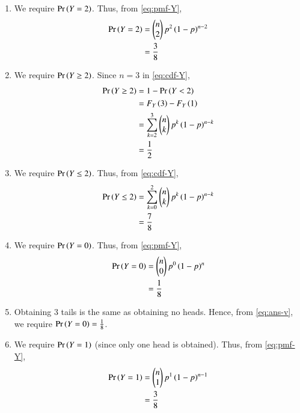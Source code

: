 \documentclass[journal,12pt,twocolumn]{IEEEtran}
\begin{document}
\begin{enumerate}
\begin{enumerate}
        \item We require $\Pr\left(Y=2\right)$. Thus, from \eqref{eq:pmf-Y},
            \begin{align}
                \Pr\left(Y=2\right) &= \begin{pmatrix}n\\2\end{pmatrix}p^2\left(1-p\right)^{n-2} \\
                         &= \frac{3}{8}
            \end{align}

        \item We require $\Pr\left(Y\ge2\right)$. Since $n = 3$ in \eqref{eq:cdf-Y},
            \begin{align}
                \Pr\left(Y\ge2\right) &= 1 - \Pr\left(Y<2\right) \\
                           &= F_Y\left(3\right) - F_Y\left(1\right) \\
                           &= \sum_{k=2}^3\begin{pmatrix}n\\k\end{pmatrix}p^k\left(1-p\right)^{n-k} \\
                           &= \frac{1}{2}
            \end{align}

        \item We require $\Pr\left(Y\le2\right)$. Thus, from \eqref{eq:cdf-Y},
            \begin{align}
                \Pr\left(Y\le2\right) &= \sum_{k=0}^2\begin{pmatrix}n\\k\end{pmatrix}p^k\left(1-p\right)^{n-k} \\
                           &= \frac{7}{8}
            \end{align}

        \item We require $\Pr\left(Y=0\right)$. Thus, from \eqref{eq:pmf-Y},
            \begin{align}
                \Pr\left(Y=0\right) &= \begin{pmatrix}n\\0\end{pmatrix}p^0\left(1-p\right)^{n} \\
                           &= \frac{1}{8}
                           \label{eq:ans-v}
            \end{align}

        \item Obtaining 3 tails is the same as obtaining no heads. Hence, from 
        \eqref{eq:ans-v}, we require $\Pr\left(Y=0\right) = \frac{1}{8}$.

        \item We require $\Pr\left(Y=1\right)$ (since only one head is obtained). Thus, from 
        \eqref{eq:pmf-Y},
            \begin{align}
                \Pr\left(Y=1\right) &= \begin{pmatrix}n\\1\end{pmatrix}p^1\left(1-p\right)^{n-1} \\
                           &= \frac{3}{8}
            \end{align}


\end{enumerate}
\end{enumerate}
\end{document}
